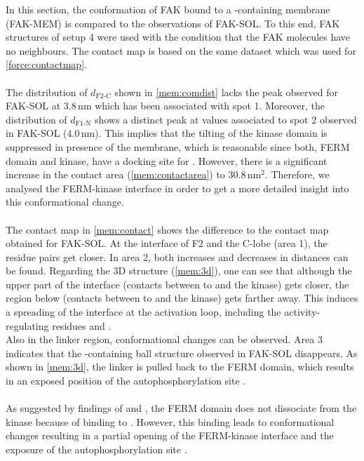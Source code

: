 In this section, the conformation of FAK bound to a \pip{}-containing membrane (FAK-MEM) is compared to the observations of FAK-SOL. To this end, FAK structures of setup 4 were used with the condition that the FAK molecules have no neighbours. The contact map is based on the same dataset which was used for \autoref{force:contactmap}.\\
\\
The distribution of $d_\text{F2-C}$ shown in \autoref{mem:comdist} lacks the peak observed for FAK-SOL at $3.8\,\si{\nano\metre}$ which has been associated with spot 1. Moreover, the distribution of $d_\text{F1-N}$ shows a distinct peak at values associated to spot 2 observed in FAK-SOL ($4.0\,\si{\nano\metre}$). This implies that the tilting of the kinase domain is suppressed in presence of the membrane, which is reasonable since both, FERM domain and kinase, have a docking site for \pip{}. However, there is a significant increase in the contact area (\autoref{mem:contactarea}) to $30.8\,\si{\nano\metre}^2$. Therefore, we analysed the FERM-kinase interface in order to get a more detailed insight into this conformational change.\\
\\
The contact map in \autoref{mem:contact} shows the difference to the contact map obtained for FAK-SOL. At the interface of F2 and the C-lobe (area 1), the residue pairs get closer. In area 2, both increases and decreases in distances can be found. Regarding the 3D structure (\autoref{mem:3d}), one can see that although the upper part of the interface (contacts between  to  and the kinase) gets closer, the region below (contacts between  to  and the kinase) gets farther away. This induces a spreading of the interface at the activation loop, including the activity-regulating residues  and .\\
Also in the linker region, conformational changes can be observed. Area 3 indicates that the -containing ball structure observed in FAK-SOL disappears. As shown in \autoref{mem:3d}, the linker is pulled back to the FERM domain, which results in an exposed position of the autophosphorylation site .\\
\\
As suggested by findings of \textcite{pap001} and \textcite{pap003}, the FERM domain does not dissociate from the kinase because of binding to \pip{}. However, this binding leads to conformational changes resulting in a partial opening of the FERM-kinase interface and the exposure of the autophosphorylation site .
